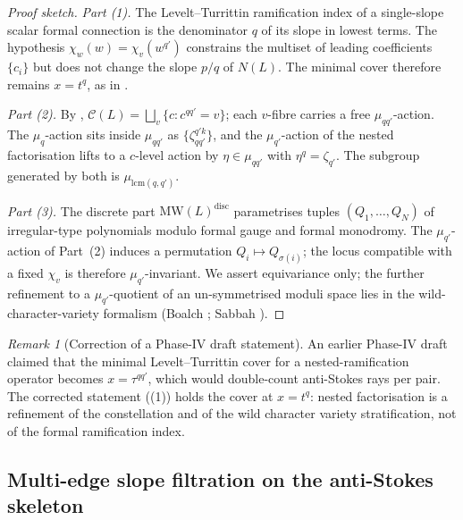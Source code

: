 \documentclass[aip,jmp,preprint,amsmath,amssymb,nofootinbib,floatfix]{revtex4-2}
\theoremstyle{plain}
\theoremstyle{definition}
\theoremstyle{remark}
\newtheorem{remark}[theorem]{Remark}
\newcommand{\NL}{N(L)}
\newcommand{\Cl}{\mathcal{C}}
\newcommand{\MW}{\mathrm{MW}}
\begin{document}
\begin{proof}[Proof sketch]
\textit{Part (1).} The Levelt--Turrittin ramification index of a single-slope
scalar formal connection is the denominator $q$ of its slope in lowest
terms. The hypothesis $\chi_w(w) = \chi_v(w^{q'})$ constrains the
multiset of leading coefficients $\{c_i\}$ but does not change the slope
$p/q$ of $\NL$. The minimal cover therefore remains $x = t^q$, as in
.

\textit{Part (2).} By , $\Cl(L) = \bigsqcup_v \{c : c^{qq'}
= v\}$; each $v$-fibre carries a free $\mu_{qq'}$-action. The
$\mu_q$-action sits inside $\mu_{qq'}$ as $\{\zeta_{qq'}^{q'k}\}$, and the
$\mu_{q'}$-action of the nested factorisation lifts to a $c$-level action
by $\eta \in \mu_{qq'}$ with $\eta^q = \zeta_{q'}$. The subgroup generated
by both is $\mu_{\mathrm{lcm}(q, q')}$.

\textit{Part (3).} The discrete part $\MW(L)^{\mathrm{disc}}$
parametrises tuples $(Q_1, \dots, Q_N)$ of irregular-type polynomials
modulo formal gauge and formal monodromy. The $\mu_{q'}$-action of
Part~(2) induces a permutation $Q_i \mapsto Q_{\sigma(i)}$; the locus
compatible with a fixed $\chi_v$ is therefore $\mu_{q'}$-invariant. We
assert equivariance only; the further refinement to a $\mu_{q'}$-quotient
of an un-symmetrised moduli space lies in the wild-character-variety
formalism (Boalch \cite{boalch-stokes,boalch-wildhodge}; Sabbah
\cite{sabbah-polarizable}).
\end{proof}

\begin{remark}[Correction of a Phase-IV draft statement]\label{rem:AT3-correction}
An earlier Phase-IV draft claimed that the minimal Levelt--Turrittin cover
for a nested-ramification operator becomes $x = \tau^{qq'}$, which would
double-count anti-Stokes rays per pair. The corrected statement
((1)) holds the cover at $x = t^q$: nested factorisation is
a refinement of the constellation and of the wild character variety
stratification, not of the formal ramification index.
\end{remark}

\subsection{Multi-edge slope filtration on the anti-Stokes skeleton}\label{ssec:AT5}
\end{document}
